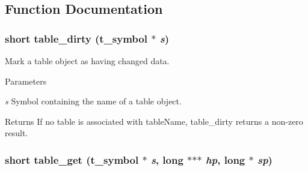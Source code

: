 \subsection{Function Documentation}
\hypertarget{group__tables_gaa72449d4792a6108489ef63c5f5ba7a3}{
\subsubsection[{table\_\-dirty}]{\setlength{\rightskip}{0pt plus 5cm}short table\_\-dirty ({\bf t\_\-symbol} $\ast$ {\em s})}}
\label{group__tables_gaa72449d4792a6108489ef63c5f5ba7a3}


Mark a table object as having changed data. 
\begin{DoxyParams}{Parameters}
\item[{\em s}]Symbol containing the name of a table object. \end{DoxyParams}
\begin{DoxyReturn}{Returns}
If no table is associated with tableName, table\_\-dirty returns a non-\/zero result. 
\end{DoxyReturn}
\hypertarget{group__tables_ga2c08d1383a235eb8c106c0f3afea6d21}{
\subsubsection[{table\_\-get}]{\setlength{\rightskip}{0pt plus 5cm}short table\_\-get ({\bf t\_\-symbol} $\ast$ {\em s}, \/  long $\ast$$\ast$$\ast$ {\em hp}, \/  long $\ast$ {\em sp})}}
\label{group__tables_ga2c08d1383a235eb8c106c0f3afea6d21}


